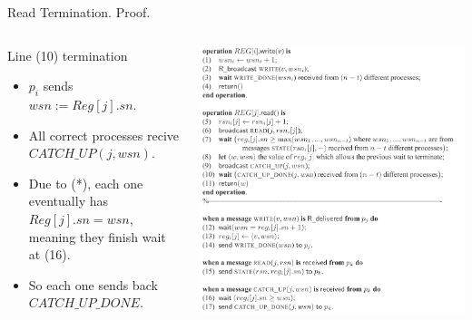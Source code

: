 \begin{frame}{Read Termination. Proof.}
    \begin{columns}[T]
        \begin{column}{.5\textwidth}
            \begin{block}{Line (10) termination}
                \begin{itemize}
                    \item $p_i$ sends $wsn:=Reg[j].sn$.
                    \item All correct processes recive $CATCH\_UP(j,wsn)$.
                    \item Due to (*), each one eventually has $Reg[j].sn = wsn$, meaning they finish wait at (16).
                    \item So each one sends back $CATCH\_UP\_DONE$.
                \end{itemize}
            \end{block}
        \end{column}
        \begin{column}{.5\textwidth}
            \includegraphics[scale=.465]{resources/mainalg.png}
        \end{column}
    \end{columns}
\end{frame}

